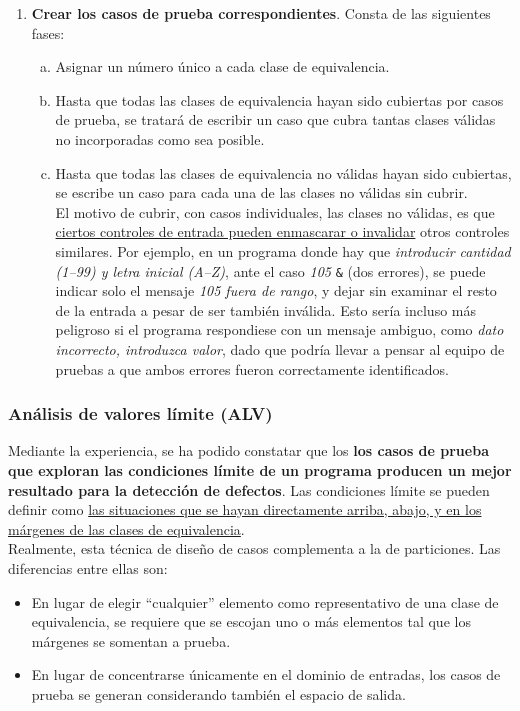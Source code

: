 \begin{enumerate}
    \item \textbf{Crear los casos de prueba correspondientes}. Consta de las siguientes fases:
    
    \begin{enumerate}[a.]
        \item Asignar un número único a cada clase de equivalencia.
        \item Hasta que todas las clases de equivalencia hayan sido cubiertas por casos de prueba, se tratará de escribir un caso que cubra tantas clases válidas no incorporadas como sea posible.
        \item Hasta que todas las clases de equivalencia no válidas hayan sido cubiertas, se escribe un caso para cada una de las clases no válidas sin cubrir.\\
        
        El motivo de cubrir, con casos individuales, las clases no válidas, es que \uline{ciertos controles de entrada pueden enmascarar o invalidar} otros controles similares. Por ejemplo, en un programa donde hay que \textit{introducir cantidad (1--99) y letra inicial (A--Z)}, ante el caso \textit{105} \texttt{\&} (dos errores), se puede indicar solo el mensaje \textit{105 fuera de rango}, y dejar sin examinar el resto de la entrada a pesar de ser también inválida. Esto sería incluso más peligroso si el programa respondiese con un mensaje ambiguo, como \textit{dato incorrecto, introduzca valor}, dado que podría llevar a pensar al equipo de pruebas a que ambos errores fueron correctamente identificados.
    \end{enumerate}
\end{enumerate}

\subsubsection{Análisis de valores límite (ALV)}

Mediante la experiencia, se ha podido constatar que los \textbf{los casos de prueba que exploran las condiciones límite de un programa producen un mejor resultado para la detección de defectos}. Las condiciones límite se pueden definir como \uline{las situaciones que se hayan directamente arriba, abajo, y en los márgenes de las clases de equivalencia}.\\

Realmente, esta técnica de diseño de casos complementa a la de particiones. Las diferencias entre ellas son:

\begin{itemize}
    \item En lugar de elegir ``cualquier'' elemento como representativo de una clase de equivalencia, se requiere que se escojan uno o más elementos tal que los márgenes se somentan a prueba.
    \item En lugar de concentrarse únicamente en el dominio de entradas, los casos de prueba se generan considerando también el espacio de salida.
\end{itemize}

